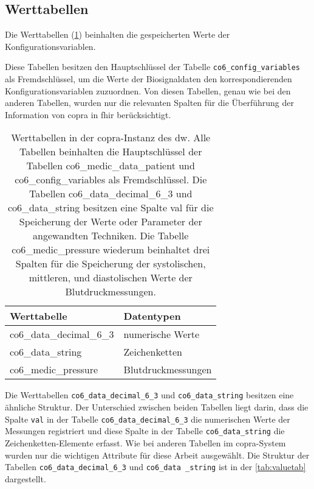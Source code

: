 \subsection{Werttabellen} \label{subsec:valuetables}

Die Werttabellen (\ref{tab:valuetable}) beinhalten die gespeicherten Werte der Konfigurationsvariablen. 

Diese Tabellen besitzen den Hauptschlüssel der Tabelle \texttt{co6\_config\_variables} als Fremdschlüssel, um die Werte der Biosignaldaten den korrespondierenden Konfigurationsvariablen zuzuordnen. Von diesen Tabellen, genau wie bei den anderen Tabellen, wurden nur die relevanten Spalten für die Überführung der Information von \ac{copra} in \ac{fhir} berücksichtigt.

\clearpage

\begin{table}[ht]
	\centering  
	\caption[Werttabellen in der \acs{copra}-Instanz]{Werttabellen in der \ac{copra}-Instanz des \ac{dw}. Alle Tabellen beinhalten die Hauptschlüssel der Tabellen co6\_medic\_data\_patient und co6\_config\_variables als Fremdschlüssel. Die Tabellen co6\_data\_decimal\_6\_3 und co6\_data\_string besitzen eine Spalte \glqq val\grqq{} für die Speicherung der Werte oder Parameter der angewandten Techniken. Die Tabelle co6\_medic\_pressure wiederum beinhaltet drei Spalten für die Speicherung der systolischen, mittleren, und diastolischen Werte der Blutdruckmessungen.}
	\label{tab:valuetable}
	\begin{tabular}{|l|l|}
		\hline
		\bfseries Werttabelle & \bfseries Datentypen \\ \hline
		co6\_data\_decimal\_6\_3 & numerische Werte \\ \hline
		co6\_data\_string & Zeichenketten \\ \hline
		co6\_medic\_pressure & Blutdruckmessungen \\ \hline
	\end{tabular}
\end{table}

Die Werttabellen \texttt{co6\_data\_decimal\_6\_3} und \texttt{co6\_data\_string} besitzen eine ähnliche Struktur. Der Unterschied zwischen beiden Tabellen liegt darin, dass die Spalte \texttt{val} in der Tabelle \texttt{co6\_data\_decimal\_6\_3} die numerischen Werte der Messungen registriert und diese Spalte in der Tabelle \texttt{co6\_data\_string} die Zeichenketten-Elemente erfasst. Wie bei anderen Tabellen im \ac{copra}-System wurden nur die wichtigen Attribute für diese Arbeit ausgewählt. Die Struktur der Tabellen \texttt{co6\_data\_decimal\_6\_3} und \texttt{co6\_data \_string} ist in der \ref{tab:valuetab} dargestellt.

